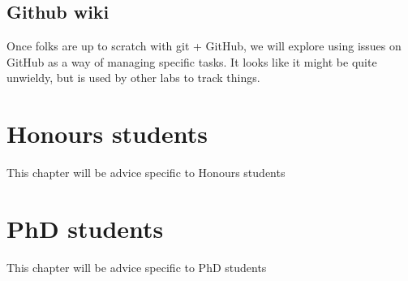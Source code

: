 \documentclass[]{book}
\theoremstyle{definition}
\theoremstyle{definition}
\theoremstyle{definition}
\theoremstyle{remark}
\begin{document}
\hypertarget{github-wiki}{%
\section{Github wiki}\label{github-wiki}}

Once folks are up to scratch with git + GitHub, we will explore using
issues on GitHub as a way of managing specific tasks. It looks like it
might be quite unwieldy, but is used by other labs to track things.

\hypertarget{honours-students-1}{%
\chapter{Honours students}\label{honours-students-1}}

This chapter will be advice specific to Honours students

\hypertarget{phd-students-1}{%
\chapter{PhD students}\label{phd-students-1}}

This chapter will be advice specific to PhD students


\end{document}
